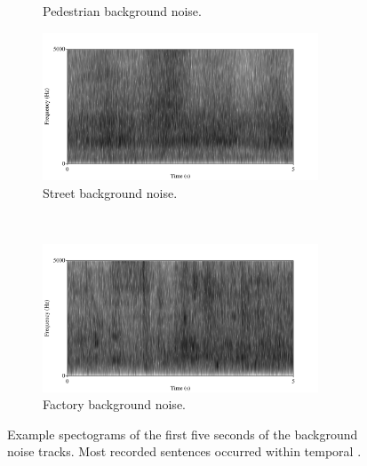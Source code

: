 \begin{figure}[h!]
\begin{subfigure}{0.475\linewidth}
  \caption{Pedestrian background noise.}
  \label{fig:ped-bkgrnd}
\end{subfigure}
\qquad
\begin{subfigure}{0.475\linewidth}
  \centering
  \includegraphics[width=0.9\textwidth]{figure/spctgrm-str-background.png}
  \caption{Street background noise.}
  \label{fig:str-bkgrnd}
\end{subfigure}%
\\[2ex]
\begin{center}
\begin{subfigure}{0.475\linewidth}
  \centering
  \includegraphics[width=0.9\textwidth]{figure/spctgrm-fac-background.png}
  \caption{Factory background noise.}
  \label{fig:fac-bkgrnd}
\end{subfigure}
\end{center}
\caption{Example \DIFaddbeginFL {}\DIFaddendFL spectograms of the first five seconds of the background noise tracks. Most recorded sentences occurred within \DIFdelbeginFL {}\DIFdelendFL \DIFaddbeginFL {}\DIFaddendFL temporal \DIFdelbeginFL {}\DIFdelendFL \DIFaddbeginFL {}\DIFaddendFL .}
\label{fig:bkgrnd-noises}
\end{figure}

